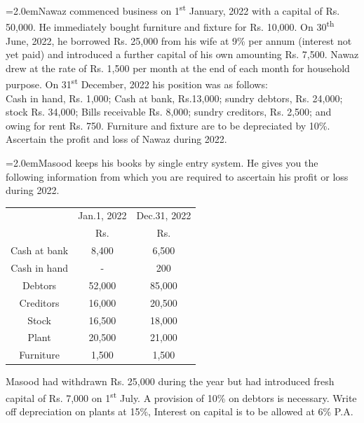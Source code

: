\documentclass[11pt,a4paper]{article}
\newcommand{\lqn}[2]{\Needspace{6\baselineskip}\par\medskip\noindent\hangindent=2.0em\hangafter=1\makebox[2.0em][l]{\textbf{#1.}}#2\par}
\begin{document}
\lqn{5}{Nawaz commenced business on 1\textsuperscript{st}  January, 2022 with a capital of Rs. 50,000. He immediately bought furniture and fixture for Rs. 10,000. On 30\textsuperscript{th}  June, 2022, he borrowed Rs. 25,000 from his wife at 9\% per annum (interest not yet paid) and introduced a further capital of his own amounting Rs. 7,500. Nawaz drew at the rate of Rs. 1,500 per month at the end of each month for household purpose. On 31\textsuperscript{st}  December, 2022 his position was as follows:\\
Cash in hand, Rs. 1,000; Cash at bank, Rs.13,000; sundry debtors, Rs. 24,000; stock Rs. 34,000; Bills receivable Rs. 8,000; sundry creditors, Rs. 2,500; and owing for rent Rs. 750. Furniture and fixture are to be depreciated by 10\%. Ascertain the profit and loss of Nawaz during 2022.\par
}
\lqn{6}{Masood keeps his books by single entry system. He gives you the following information from which you are required to ascertain his profit or loss during 2022.\par
\par\smallskip\noindent\hspace*{1.2em}\begin{tabular}{|ccc|}
\hline
 & Jan.1, 2022 & Dec.31, 2022 \\
 & Rs. & Rs. \\
Cash at bank & 8,400 & 6,500 \\
Cash in hand & - & 200 \\
Debtors & 52,000 & 85,000 \\
Creditors & 16,000 & 20,500 \\
Stock & 16,500 & 18,000 \\
Plant & 20,500 & 21,000 \\
Furniture & 1,500 & 1,500 \\
\hline
\end{tabular}\par\smallskip
Masood had withdrawn Rs. 25,000 during the year but had introduced fresh capital of Rs. 7,000 on 1\textsuperscript{st}  July. A provision of 10\% on debtors is necessary. Write off depreciation on plants at 15\%, Interest on capital is to be allowed at 6\% P.A.\par
}
\end{document}
